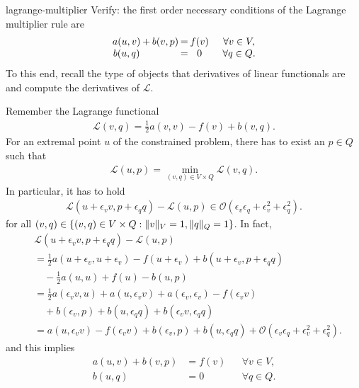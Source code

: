 \begin{Problem}{lagrange-multiplier}
  Verify: the first order necessary conditions of the Lagrange
  multiplier rule are
  \begin{gather}
    \arraycolsep.1em
    \begin{matrix}
      a(u,v) &+& b(v,p) &=& f(v) &\quad&\forall v\in V, \\
      b(u,q) && &=& 0 &&\forall q\in Q.
    \end{matrix}
  \end{gather}
  To this end, recall the type of objects that derivatives of linear
  functionals are and compute the derivatives of $\mathscr{L}$.
\begin{solution}
Remember the Lagrange functional
\begin{align}
 \mathscr{L}(v,q) = \tfrac12 a(v,v) - f(v) + b(v,q).
\end{align}
For an extremal point $u$ of the constrained problem,
there has to exist an $p\in Q$ such that
\begin{align}
  \mathscr{L}(u,p) = \min_{(v,q)\in V\times Q} \mathscr{L}(v,q).
\end{align}
In particular, it has to hold
\begin{align}
  \mathscr{L}(u+\epsilon_v v,p+\epsilon_q q) -\mathscr{L}(u,p)\in\mathcal{O}(\epsilon_v\epsilon_q+\epsilon_v^2+\epsilon_q^2).
\end{align}
for all $(v,q)\in\{(v,q)\in V\times Q: \lVert v\rVert_V=1, \lVert q\rVert_Q=1\}$.
In fact,
\begin{align}
 &\mathscr{L}(u+\epsilon_v v,p+\epsilon_q q) - \mathscr{L}(u,p)\\
 &=\tfrac12 a(u+\epsilon_v,u+\epsilon_v) - f(u+\epsilon_v) + b(u+\epsilon_v,p+\epsilon_q q)\\&\quad
   -\tfrac12 a(u,u) + f(u) - b(u,p)\\
   &=\tfrac12 a(\epsilon_v v,u)+a(u,\epsilon_v v)+a(\epsilon_v,\epsilon_v) - f(\epsilon_v v)\\&\quad + b(\epsilon_v,p )+b(u,\epsilon_q q)+b(\epsilon_v v,\epsilon_q q)\\
   &=a(u, \epsilon_v v)-f(\epsilon_v v) + b(\epsilon_v,p )+b(u,\epsilon_q q)+\mathcal{O}(\epsilon_v\epsilon_q+\epsilon_v^2+\epsilon_q^2).
\end{align}
and this implies
\begin{align}
      a(u,v) + b(v,p)  &= f(v) &&\forall v\in V, \\
               b(u,q)  &= 0    &&\forall q\in Q.
\end{align}
\end{solution}
\end{Problem}


